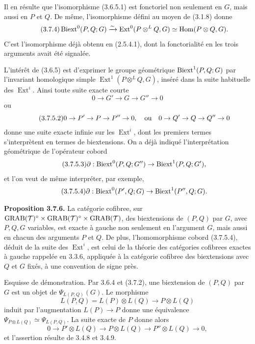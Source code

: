 \documentclass[11pt]{article}
\providecommand{\Hom}{\operatorname{Hom}}
\providecommand{\Ext}{\operatorname{Ext}}
\begin{document}
Il en résulte que l'isomorphisme (3.6.5.1) est fonctoriel non seulement en \(G\), mais aussi en \(P\) et \(Q\).  De même, l'isomorphisme défini au moyen de (3.1.8) donne
\begin{equation}\tag{3.7.4}
 \Biext^0(P,Q;G)\xrightarrow{\sim}
 \Ext^0(P\otimes^L Q,G)\simeq\Hom(P\otimes Q,G).
\end{equation}
C'est l'isomorphisme déjà obtenu en (2.5.4.1), dont la fonctorialité en les trois arguments avait été signalée.

L'intérêt de (3.6.5) est d'exprimer le groupe géométrique \(\operatorname{Biext}^1(P,Q;G)\) par l'invariant homologique simple \(\Ext^1(P\otimes^L Q,G)\), inséré dans la suite habituelle des \(\Ext^i\).  Ainsi toute suite exacte courte
\begin{equation}\tag{3.7.5.1}
        0\to G'\to G\to G''\to0
\end{equation}
ou
\begin{equation}\tag{3.7.5.2}
        0\to P'\to P\to P''\to0,
        \quad\hbox{ou}\quad
        0\to Q'\to Q\to Q''\to0
\end{equation}
donne une suite exacte infinie sur les \(\Ext^i\), dont les premiers termes s'interprètent en termes de biextensions.  On a déjà indiqué l'interprétation géométrique de l'opérateur cobord
\begin{equation}\tag{3.7.5.3}
 \partial:\operatorname{Biext}^0(P,Q;G'')\to\operatorname{Biext}^1(P,Q;G'),
\end{equation}
et l'on veut de même interpréter, par exemple,
\begin{equation}\tag{3.7.5.4}
 \partial:\operatorname{Biext}^0(P',Q;G)\to\operatorname{Biext}^1(P'',Q;G).
\end{equation}

\textbf{Proposition 3.7.6.}  La catégorie cofibree, sur
\(\operatorname{GRAB}(\mathcal T)^{\circ}\times\operatorname{GRAB}(\mathcal T)^{\circ}\times\operatorname{GRAB}(\mathcal T)\), des biextensions de \((P,Q)\) par \(G\), avec \(P,Q,G\) variables, est exacte à gauche non seulement en l'argument \(G\), mais aussi en chacun des arguments \(P\) et \(Q\).  De plus, l'homomorphisme cobord (3.7.5.4), déduit de la suite des \(\Ext^i\), est celui de la théorie des catégories cofibrees exactes à gauche rappelée en 3.3.6, appliquée à la catégorie cofibree des biextensions avec \(Q\) et \(G\) fixés, à une convention de signe près.

Esquisse de démonstration.  Par 3.6.4 et (3.7.2), une biextension de \((P,Q)\) par \(G\) est un objet de \(\Psi_{L(P,Q)}(G)\).  Le morphisme
\[
        L(P,Q)=L(P)\otimes L(Q)\to P\otimes L(Q)
\]
induit par l'augmentation \(L(P)\to P\) donne une équivalence \(\Psi_{P\otimes L(Q)}\simeq\Psi_{L(P,Q)}\).  La suite exacte de \(P\) donne alors
\begin{equation}\tag{3.7.6.1}
        0\to P'\otimes L(Q)\to P\otimes L(Q)\to P''\otimes L(Q)\to0,
\end{equation}
et l'assertion résulte de 3.4.8 et 3.4.9.
\end{document}
